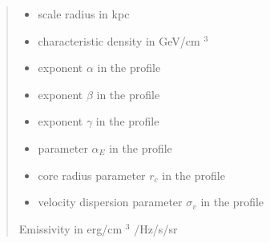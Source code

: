 \documentclass[letterpaper,10pt,english]{sphinxmanual}
\begin{document}
\begin{fulllineitems}
\begin{itemize}
\end{itemize}
\begin{quote}\begin{description}
\begin{itemize}
\item {} 
\sphinxAtStartPar
{} \textendash{} scale radius in kpc

\item {} 
\sphinxAtStartPar
{} \textendash{} characteristic density in GeV/cm \({}^3\)

\item {} 
\sphinxAtStartPar
{} \textendash{} exponent \(\alpha\) in the {\hyperref[\detokenize{diffsph.profiles:diffsph.profiles.templates.hdz}]{}} profile

\item {} 
\sphinxAtStartPar
{} \textendash{} exponent \(\beta\) in the {\hyperref[\detokenize{diffsph.profiles:diffsph.profiles.templates.hdz}]{}} profile

\item {} 
\sphinxAtStartPar
{} \textendash{} exponent \(\gamma\) in the {\hyperref[\detokenize{diffsph.profiles:diffsph.profiles.templates.hdz}]{}} profile

\item {} 
\sphinxAtStartPar
{} \textendash{} parameter \(\alpha_E\) in the {\hyperref[\detokenize{diffsph.profiles:diffsph.profiles.templates.enst}]{}} profile

\item {} 
\sphinxAtStartPar
{} \textendash{} core radius parameter \(r_c\) in the {\hyperref[\detokenize{diffsph.profiles:diffsph.profiles.templates.cnfw}]{}} profile

\item {} 
\sphinxAtStartPar
{} \textendash{} velocity dispersion parameter \(\sigma_v\) in the {\hyperref[\detokenize{diffsph.profiles:diffsph.profiles.templates.sis}]{}} profile

\end{itemize}

\sphinxAtStartPar
Emissivity in erg/cm \({}^3\) /Hz/s/sr

\end{description}\end{quote}

\end{fulllineitems}
\end{document}
